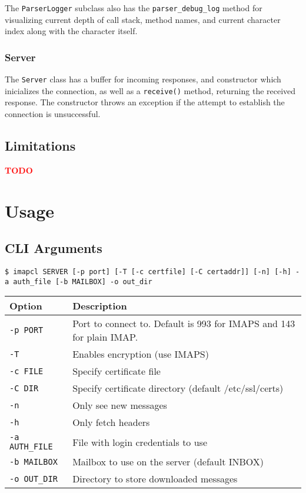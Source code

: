 \documentclass[a4]{report}
\newcommand{\TODO}{
    \textbf{\textcolor{red}{TODO}}
}
\begin{document}
The \texttt{ParserLogger} subclass also has the \texttt{parser\_debug\_log} method for visualizing current depth of call stack, method names, and current character index along with the character itself.

\subsection{Server}

The \texttt{Server} class has a buffer for incoming responses, and constructor which inicializes the connection, as well as a \texttt{receive()} method, returning the received response. The constructor throws an exception if the attempt to establish the connection is unsuccessful.

\section{Limitations}

\TODO %

\chapter{Usage}

\section{CLI Arguments}

\texttt{\$ imapcl SERVER [-p port] [-T [-c certfile] [-C certaddr]] [-n] [-h] -a auth\_file [-b MAILBOX] -o out\_dir}

\begin{table}[h]
  \renewcommand*{\arraystretch}{1.0}
  \centering
  \begin{tabular}{|l|l|}
    \hline
    Option & Description\\
    \hline
    \texttt{-p PORT}      & Port to connect to. Default is 993 for IMAPS and 143 for plain IMAP.\\
    \texttt{-T}          & Enables encryption (use IMAPS)\\
    \texttt{-c FILE}     & Specify certificate file\\
    \texttt{-C DIR}      & Specify certificate directory (default /etc/ssl/certs)\\
    \texttt{-n}          & Only see new messages\\
    \texttt{-h}          & Only fetch headers\\
    \texttt{-a AUTH\_FILE}& File with login credentials to use\\
    \texttt{-b MAILBOX}  & Mailbox to use on the server (default INBOX)\\
    \texttt{-o OUT\_DIR}  & Directory to store downloaded messages\\
    \hline
  \end{tabular}
\end{table}
\end{document}
